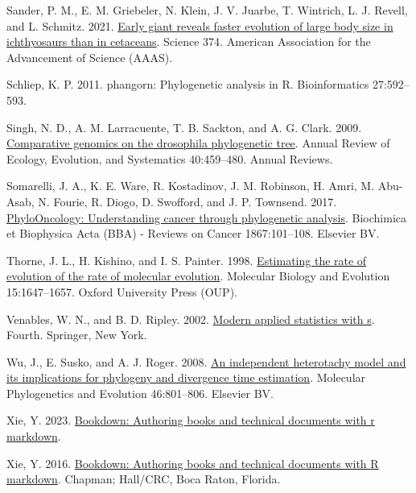 \documentclass[fleqn,10pt,lineno]{wlpeerj} %
\newlength{\cslhangindent}
\newenvironment{CSLReferences}[2] %
 {\begin{list}{}{%
  \setlength{\itemindent}{0pt}
  \setlength{\leftmargin}{0pt}
  \setlength{\parsep}{0pt}
  \ifodd #1
   \setlength{\leftmargin}{\cslhangindent}
   \setlength{\itemindent}{-1\cslhangindent}
  \fi
  \setlength{\itemsep}{#2\baselineskip}}}
 {\end{list}}
\begin{document}
\begin{CSLReferences}{1}{0}
Sander, P. M., E. M. Griebeler, N. Klein, J. V. Juarbe, T. Wintrich, L. J. Revell, and L. Schmitz. 2021. \href{https://doi.org/10.1126/science.abf5787}{Early giant reveals faster evolution of large body size in ichthyosaurs than in cetaceans}. Science 374. American Association for the Advancement of Science (AAAS).

Schliep, K. P. 2011. {phangorn}: Phylogenetic analysis in {R}. Bioinformatics 27:592--593.

Singh, N. D., A. M. Larracuente, T. B. Sackton, and A. G. Clark. 2009. \href{https://doi.org/10.1146/annurev.ecolsys.110308.120214}{Comparative genomics on the drosophila phylogenetic tree}. Annual Review of Ecology, Evolution, and Systematics 40:459--480. Annual Reviews.

Somarelli, J. A., K. E. Ware, R. Kostadinov, J. M. Robinson, H. Amri, M. Abu-Asab, N. Fourie, R. Diogo, D. Swofford, and J. P. Townsend. 2017. \href{https://doi.org/10.1016/j.bbcan.2016.10.006}{PhyloOncology: Understanding cancer through phylogenetic analysis}. Biochimica et Biophysica Acta (BBA) - Reviews on Cancer 1867:101--108. Elsevier BV.

Thorne, J. L., H. Kishino, and I. S. Painter. 1998. \href{https://doi.org/10.1093/oxfordjournals.molbev.a025892}{Estimating the rate of evolution of the rate of molecular evolution}. Molecular Biology and Evolution 15:1647--1657. Oxford University Press (OUP).

Venables, W. N., and B. D. Ripley. 2002. \href{https://www.stats.ox.ac.uk/pub/MASS4/}{Modern applied statistics with s}. Fourth. Springer, New York.

Wu, J., E. Susko, and A. J. Roger. 2008. \href{https://doi.org/10.1016/j.ympev.2007.06.020}{An independent heterotachy model and its implications for phylogeny and divergence time estimation}. Molecular Phylogenetics and Evolution 46:801--806. Elsevier BV.

Xie, Y. 2023. \href{https://github.com/rstudio/bookdown}{Bookdown: Authoring books and technical documents with r markdown}.

Xie, Y. 2016. \href{https://bookdown.org/yihui/bookdown}{Bookdown: Authoring books and technical documents with {R} markdown}. Chapman; Hall/CRC, Boca Raton, Florida.


\end{CSLReferences}
\end{document}
